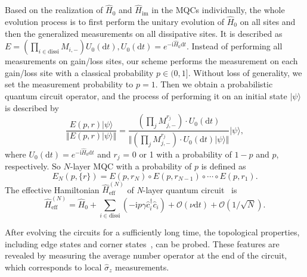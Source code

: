 \documentclass[longbibliography, aps, prx, amsmath, amssymb, amsfonts, twocolumn,superscriptaddress, footinbib]{revtex4-1}
\begin{document}
	Based on the realization of $\hat{H}_0$ and $\hat{H}_{\text{im}}$ in the MQCs individually, the whole evolution process is to first perform the unitary evolution of $\hat{H}_0$ on all sites and then the generalized measurements on all dissipative sites. It is described as $E=(\prod_{i\in \text{dissi}} M_{i,-}) U_{0}(\mathrm{d} t),U_{0}(\mathrm{d}t)=e^{-\mathrm{i}\hat{H}_0 \mathrm{d}t}$.
	Instead of performing all measurements on gain/loss sites, our scheme performs the measurement on each gain/loss site with a classical probability $p\in(0,1]$. 
	Without loss of generality, we set the measurement probability to $p=1$. 
	Then we obtain a probabilistic quantum circuit operator, and the process of performing it on an initial state $\vert \psi \rangle$ is described by
	\begin{equation}
		\frac{E(p,r) \vert \psi \rangle}{\Vert E(p,r) \vert \psi \rangle \Vert} = \frac{(\prod_j M_{j,-}^{r_j}) \cdot U_0(\mathrm{d}t)}{\Vert (\prod_j M_{j,-}^{r_j}) \cdot U_0(\mathrm{d}t) \vert \psi \rangle \Vert} \vert \psi \rangle,
	\end{equation}
	where $U_0(\mathrm{d} t) = e^{-\mathrm{i}\hat{H}_0 \mathrm{d} t}$ and $r_j$ = 0 or 1 with a probability of $1-p$ and $p$, respectively. So $N$-layer MQC with a probability of $p$ is defined as
	\begin{equation}
		E_N(p,\{r\}) = E(p, r_N) \circ E(p, r_{N-1}) \circ \cdots \circ E(p, r_1).
	\end{equation}
	The effective Hamiltonian $\hat{H}_{\text{eff}}^{(N)}$ of \textit{N}-layer quantum circuit~\cite{fleckenstein2022non} is 
	\begin{equation}
		\hat{H}^{(N)}_{\text{eff}} = \hat{H}_0 + \sum_{i\in \text{dissi} } (-\mathrm{i} p\gamma \hat{c}_i^{\dagger} \hat{c}_i) + \mathcal{O}(\nu\mathrm{d} t) + \mathcal{O}(1/\sqrt{N}).\label{eq:H_scheme1}
	\end{equation}

	After evolving the circuits for a sufficiently long time, the topological properties, including edge states and corner states~\cite{zou2021observation,shen2025observation}, can be probed. These features are revealed by measuring the average number operator at the end of the circuit, which corresponds to local $\hat{\sigma}_z$ measurements. 
\end{document}
